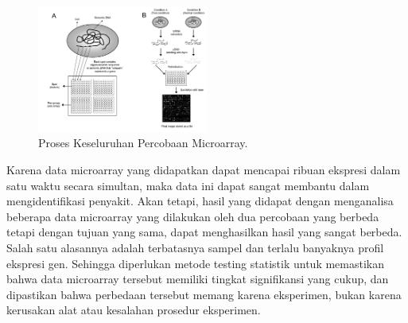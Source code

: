 \begin{figure}
	\centering
	\includegraphics[width=0.50\textwidth]
		{pics/gbr2_2.png}
	\caption{Proses Keseluruhan Percobaan Microarray.\citep{babu2004introduction}}
	\label{fig:gbr2.2}
\end{figure}


Karena data microarray yang didapatkan dapat mencapai ribuan ekspresi dalam satu waktu secara simultan, maka data ini dapat sangat membantu dalam mengidentifikasi penyakit. Akan tetapi, hasil yang didapat dengan menganalisa beberapa data microarray yang dilakukan oleh dua percobaan yang berbeda tetapi dengan tujuan yang sama, dapat menghasilkan hasil yang sangat berbeda. Salah satu alasannya adalah terbatasnya sampel dan terlalu banyaknya profil ekspresi gen. Sehingga diperlukan metode testing statistik untuk memastikan bahwa data microarray tersebut memiliki tingkat signifikansi yang cukup, dan dipastikan bahwa perbedaan tersebut memang karena eksperimen, bukan karena kerusakan alat atau kesalahan prosedur eksperimen.

